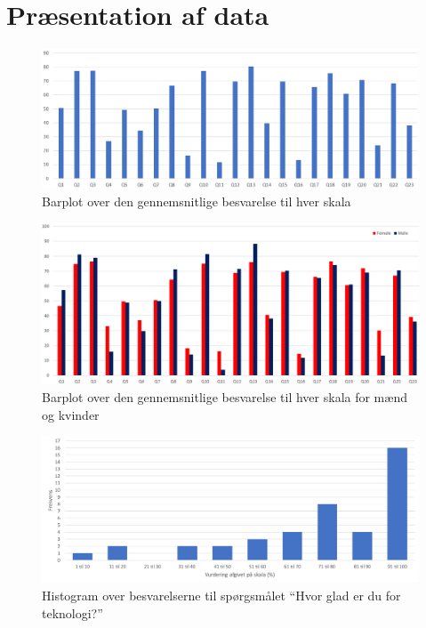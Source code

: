 \section{Præsentation af data}
\label{TestAfSkalaPraesentationAfData}
%
\begin{figure}[H]
\centering
\includegraphics[width = \textwidth]{Figure/DatabehandlingSkalaer/BarPlotRaaData} 
\caption{Barplot over den gennemsnitlige besvarelse til hver skala}
\label{fig:BarPlot}
\end{figure}
\noindent
%
\begin{figure}[H]
\centering
\includegraphics[width = \textwidth]{Figure/DatabehandlingSkalaer/KoenGennemnitligBesvarelser} 
\caption{Barplot over den gennemsnitlige besvarelse til hver skala for mænd og kvinder}
\label{fig:BarPlotKoen}
\end{figure}
\noindent
%
\begin{figure}[H]
\centering
\includegraphics[width = \textwidth]{Figure/DatabehandlingSkalaer/TechFrekvens} 
\caption{Histogram over besvarelserne til spørgsmålet ``Hvor glad er du for teknologi?''}
\label{fig:BarPlotTechFrekvens}
\end{figure}
